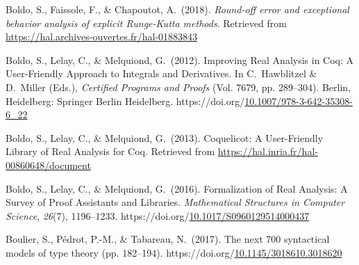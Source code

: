 \documentclass[12pt,twoside]{article}
\begin{document}
{\begin{thebibliography}{222}
\mdbibitemlabel{}Boldo, S., Faissole, F., \& Chapoutot, A.~(2018). \emph{Round-off error and exceptional behavior analysis of explicit Runge-Kutta methods}. Retrieved from \href{https://hal.archives-ouvertes.fr/hal-01883843}{{\ttfamily https://\hspace{0pt}hal.\hspace{0pt}archives-\hspace{0pt}ouvertes.\hspace{0pt}fr/\hspace{0pt}hal-\hspace{0pt}01883843}}\label{boldo_round-off_2018}%

\mdbibitemlabel{}Boldo, S., Lelay, C., \& Melquiond, G.~(2012). Improving Real Analysis in Coq: A User-Friendly Approach to Integrals and Derivatives. In C.~Hawblitzel \& D.~Miller (Eds.), \emph{Certified Programs and Proofs} (Vol. 7679, pp. 289–304). Berlin, Heidelberg: Springer Berlin Heidelberg. https://doi.org/\href{https://dx.doi.org/10.1007/978-3-642-35308-6_22}{10.1007/978-3-642-35308-6\_22}\label{hutchison_improving_2012}%

\mdbibitemlabel{}Boldo, S., Lelay, C., \& Melquiond, G.~(2013). Coquelicot: A User-Friendly Library of Real Analysis for Coq. Retrieved from \href{https://hal.inria.fr/hal-00860648/document}{{\ttfamily https://\hspace{0pt}hal.\hspace{0pt}inria.\hspace{0pt}fr/\hspace{0pt}hal-\hspace{0pt}00860648/\hspace{0pt}document}}\label{boldo_coquelicot:_2013}%

\mdbibitemlabel{}Boldo, S., Lelay, C., \& Melquiond, G.~(2016). Formalization of Real Analysis: A Survey of Proof Assistants and Libraries. \emph{Mathematical Structures in Computer Science}, \emph{26}(7), 1196–1233. https://doi.org/\href{https://dx.doi.org/10.1017/S0960129514000437}{10.1017/S0960129514000437}\label{boldo_formalization_2016}%

\mdbibitemlabel{}Boulier, S., Pédrot, P.-M., \& Tabareau, N.~(2017). The next 700 syntactical models of type theory (pp. 182–194). https://doi.org/\href{https://dx.doi.org/10.1145/3018610.3018620}{10.1145/3018610.3018620}\label{boulier_next_2017}%


\end{thebibliography}}
\end{document}
